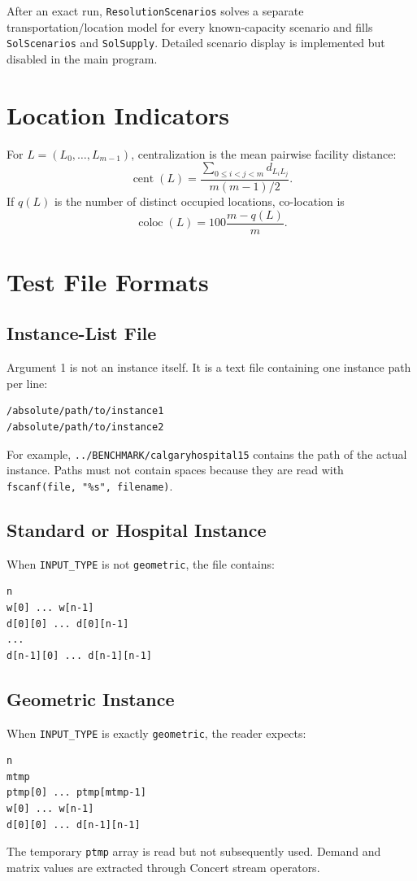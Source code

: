 \documentclass[11pt,a4paper]{article}
\newcommand{\code}[1]{\texttt{#1}}
\begin{document}
After an exact run, \code{ResolutionScenarios} solves a separate
transportation/location model for every known-capacity scenario and fills
\code{SolScenarios} and \code{SolSupply}. Detailed scenario display is
implemented but disabled in the main program.

\section{Location Indicators}

For $L=(L_0,\ldots,L_{m-1})$, centralization is the mean pairwise facility
distance:
\[
\operatorname{cent}(L)=
\frac{\sum_{0\leq i<j<m}d_{L_iL_j}}{m(m-1)/2}.
\]
If $q(L)$ is the number of distinct occupied locations, co-location is
\[
\operatorname{coloc}(L)=100\frac{m-q(L)}m.
\]

\section{Test File Formats}

\subsection{Instance-List File}

Argument 1 is not an instance itself. It is a text file containing one
instance path per line:
\begin{lstlisting}
/absolute/path/to/instance1
/absolute/path/to/instance2
\end{lstlisting}
For example, \code{../BENCHMARK/calgaryhospital15} contains the path of the
actual instance. Paths must not contain spaces because they are read with
\code{fscanf(file, "\%s", filename)}.

\subsection{Standard or Hospital Instance}

When \code{INPUT\_TYPE} is not \code{geometric}, the file contains:
\begin{lstlisting}
n
w[0] ... w[n-1]
d[0][0] ... d[0][n-1]
...
d[n-1][0] ... d[n-1][n-1]
\end{lstlisting}

\subsection{Geometric Instance}

When \code{INPUT\_TYPE} is exactly \code{geometric}, the reader expects:
\begin{lstlisting}
n
mtmp
ptmp[0] ... ptmp[mtmp-1]
w[0] ... w[n-1]
d[0][0] ... d[n-1][n-1]
\end{lstlisting}
The temporary \code{ptmp} array is read but not subsequently used. Demand and
matrix values are extracted through Concert stream operators.
\end{document}
